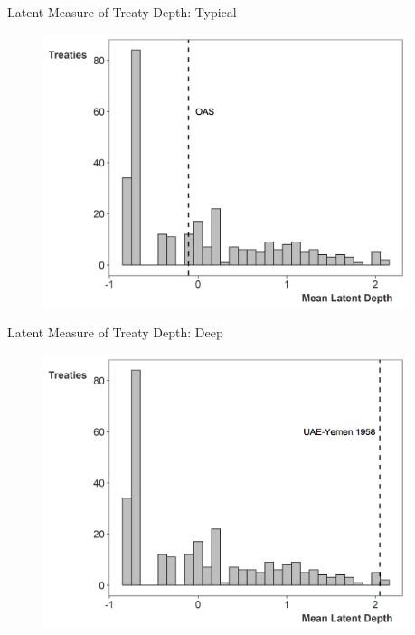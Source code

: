 \documentclass[12pt]{beamer}
\begin{document}

\begin{frame}{Latent Measure of Treaty Depth: Typical}

\begin{figure}[htbp]
	\centering
		\includegraphics[width=0.95\textwidth]{ld-hist-median.png}
\end{figure}


\end{frame} 


\begin{frame}{Latent Measure of Treaty Depth: Deep}

\begin{figure}[htbp]
	\centering
		\includegraphics[width=0.95\textwidth]{ld-hist-deep.png}
\end{figure}


\end{frame} 
\end{document}

